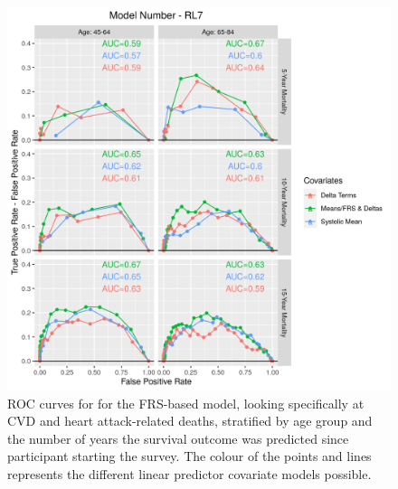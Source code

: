 \documentclass[
]{article}
\begin{document}
\begin{figure}
\hypertarget{fig:ROC_RL7}{%
\centering
\includegraphics{./Rmarkdown_Plots/ROC_CAx-Covariates_EventType_RL7.png}
\caption{ROC curves for for the FRS-based model, looking specifically at CVD and heart attack-related deaths, stratified by age group and the number of years the survival outcome was predicted since participant starting the survey. The colour of the points and lines represents the different linear predictor covariate models possible.}\label{fig:ROC_RL7}
}
\end{figure}
\end{document}
